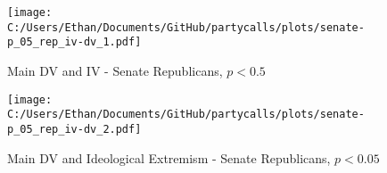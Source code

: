 \documentclass[12pt]{article}
\begin{document}
\begin{figure}[h]
	\caption{Main DV and IV - Senate Republicans, $p < 0.5$}
	\texttt{[image: C:/Users/Ethan/Documents/GitHub/partycalls/plots/senate-p\_05\_rep\_iv-dv\_1.pdf]}
\end{figure}

\begin{figure}[h]
	\caption{Main DV and Ideological Extremism - Senate Republicans, $p < 0.05$}
	\texttt{[image: C:/Users/Ethan/Documents/GitHub/partycalls/plots/senate-p\_05\_rep\_iv-dv\_2.pdf]}
\end{figure}
\end{document}
